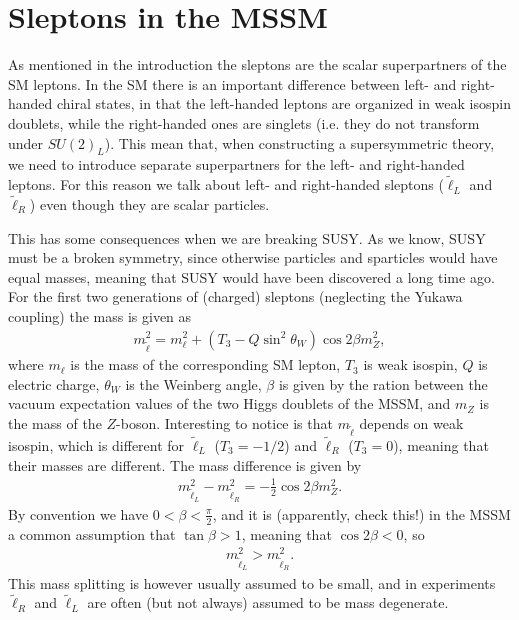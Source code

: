 \documentclass[twocolumn,a4paper,10pt]{article}
\begin{document}
\section{Sleptons in the MSSM}

As mentioned in the introduction the sleptons are the scalar superpartners of the SM leptons. In the 
SM there is an important difference between left- and right-handed chiral states, in that the 
left-handed leptons are organized in weak isospin doublets, while the right-handed ones are singlets 
(i.e. they do not transform under $SU(2)_L$). This mean that, when constructing a supersymmetric theory, 
we need to introduce separate superpartners for the left- and right-handed leptons. For this reason we 
talk about left- and right-handed sleptons ($\tilde{\ell}_L$ and $\tilde{\ell}_R$) even though they are 
scalar particles. 

This has some consequences when we are breaking SUSY. As we know, SUSY must be a broken symmetry, 
since otherwise particles and sparticles would have equal masses, meaning that SUSY would have been 
discovered a long time ago. For the first two generations of (charged) sleptons (neglecting the 
Yukawa coupling) the mass is given as
\begin{align}
m_{\tilde{\ell}}^2 = m_{\ell}^2 + (T_3 - Q\sin^2\theta_W)\cos 2\beta m_Z^2, 
\end{align}  
where $m_{\ell}$ is the  mass of the corresponding SM lepton, $T_3$ is weak isospin, $Q$ is 
electric charge, $\theta_W$ is the Weinberg angle, $\beta$ is given by the ration between the 
vacuum expectation values of the two Higgs doublets of the MSSM, and $m_Z$ is the mass of the $Z$-boson.
Interesting to notice is that $m_{\tilde{\ell}}$ depends on weak isospin, which is different for 
$\tilde{\ell}_L$ ($T_3 = -1/2$) and $\tilde{\ell}_R$ ($T_3 = 0$), meaning that their masses are 
different. The mass difference is given by 
\begin{align}
m_{\tilde{\ell}_L}^2 - m_{\tilde{\ell}_R}^2 = -\frac{1}{2}\cos 2\beta m_Z^2.  
\end{align}  
By convention we have $0 < \beta < \frac{\pi}{2}$, and it is (apparently, check this!) in the MSSM a 
common assumption that $\tan\beta > 1$, meaning that $\cos 2\beta < 0$, so 
\begin{align*}
m_{\tilde{\ell}_L}^2 > m_{\tilde{\ell}_R}^2. 
\end{align*} 
This mass splitting is however usually assumed to be small, and in experiments $\tilde{\ell}_R$ and 
$\tilde{\ell}_L$ are often (but not always) assumed to be mass degenerate. 
\end{document}
